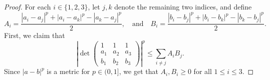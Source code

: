 \documentclass[11pt,a4paper]{amsart}
\theoremstyle{plain}
\theoremstyle{definition}
\begin{document}
\begin{proof}
    For each $i \in \{1,2,3\}$, let $j,k$ denote the remaining two indices, and define
    \[
        A_ i = \frac{|a_i - a_j|^p + |a_i - a_k|^p - |a_k - a_j|^p}{2}, \quad \text{and}\quad B_ i = \frac{|b_i - b_j|^p + |b_i - b_k|^p - |b_k - b_j|^p}{2}.
    \]
    First, we claim that
    \begin{equation} \label{eq:desired-ineq-12-claim1}
        \left|\operatorname{det}\left(\begin{array}{ccc}1 & 1 & 1 \\ a_1 & a_2 & a_3 \\ b_1 & b_2 & b_3\end{array}\right)\right|^p  
        \leq
        \sum_{i \neq j} A_i B_j.
    \end{equation}
    Since $|a-b|^p$ is a metric for $p \in (0,1]$, we get that 
        $A_i,B_i \geq 0$ for all $1 \leq i\leq 3$.


\end{proof}
\end{document}

